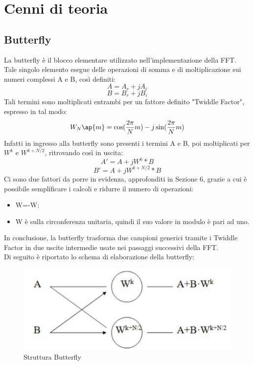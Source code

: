 \documentclass[a4paper, titlepage]{article}
\begin{document}
\section{Cenni di teoria} %
\subsection{Butterfly}  
La butterfly è il blocco elementare utilizzato nell'implementazione della FFT. Tale singolo elemento esegue delle operazioni di somma e di moltiplicazione sui numeri complessi A e B, così definiti:
\begin{equation}
    A=A_{r}+jA_{i}
\end{equation}
\begin{equation}
    B=B_{r}+jB_{i}
\end{equation}
Tali termini sono moltiplicati entrambi per un fattore definito "Twiddle Factor", espresso in tal modo:
\begin{equation}
    W_N\ap{m}=\cos(\dfrac{2\pi}{N}m) -j\sin(\dfrac{2\pi}{N}m)
\end{equation}
Infatti in ingresso alla butterfly sono presenti i termini A e B, poi moltiplicati per $W^{k}$ e $W^{k+N/2}$, ritrovando così in uscita:
\begin{equation}
    A'=A+jW^{k}*B
\end{equation}
\begin{equation}
    B'=A+jW^{k+N/2}*B
\end{equation}  
Ci sono due fattori da porre in evidenza, approfonditi in Sezione 6, grazie a cui è possibile semplificare i calcoli e ridurre il numero di operazioni:
\begin{itemize}
    \item W=-W;
    \item W è sulla circonferenza unitaria, quindi il suo valore in modulo è pari ad uno.
\end{itemize}
In conclusione, la butterfly trasforma due campioni generici tramite i Twiddle Factor in due uscite intermedie usate nei passaggi successivi della FFT.\\Di seguito è riportato lo schema di elaborazione della butterfly:
\begin{figure}[!h]
\centering
\includegraphics[scale=0.8]{butterfly.PNG}
\caption{ Struttura Butterfly}
\label{fig:Butterfly}
\end{figure}
\end{document}
